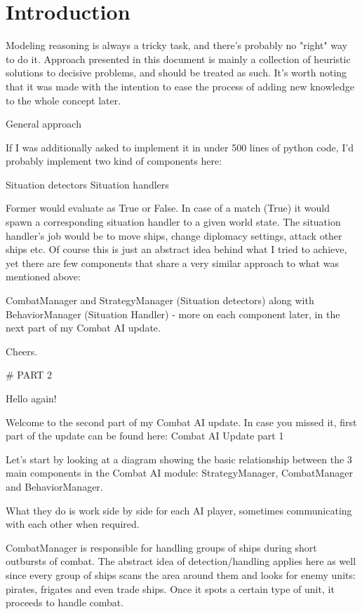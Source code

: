 \chapter{Introduction}

\begin{par}
Modeling reasoning is always a tricky task, and there's probably no "right" way to do it.
Approach presented in this document is mainly a collection of heuristic solutions to decisive problems, and should be treated as such. It's worth noting that it was made with the intention to ease the process of adding new knowledge to the whole concept later.
\end{par}

General approach

If I was additionally asked to implement it in under 500 lines of python code, I'd probably implement two kind of components here:

    Situation detectors
    Situation handlers

Former would evaluate as True or False.
In case of a match (True) it would spawn a corresponding situation handler to a given world state.
The situation handler's job would be to move ships, change diplomacy settings, attack other ships etc.
Of course this is just an abstract idea behind what I tried to achieve, yet there are few components that share a very similar approach to what was mentioned above:


CombatManager and StrategyManager (Situation detectors) along with BehaviorManager (Situation Handler) - more on each component later, in the next part of my Combat AI update.

Cheers.

# PART 2



Hello again!

Welcome to the second part of my Combat AI update. In case you missed it, first part of the update can be found here: Combat AI Update part 1

Let's start by looking at a diagram showing the basic relationship between the 3 main components in the Combat AI module: StrategyManager, CombatManager and BehaviorManager.

What they do is work side by side for each AI player, sometimes communicating with each other when required.

CombatManager is responsible for handling groups of ships during short outbursts of combat. The abstract idea of detection/handling applies here as well since every group of ships scans the area around them and looks for enemy units: pirates, frigates and even trade ships. Once it spots a certain type of unit, it proceeds to handle combat.

